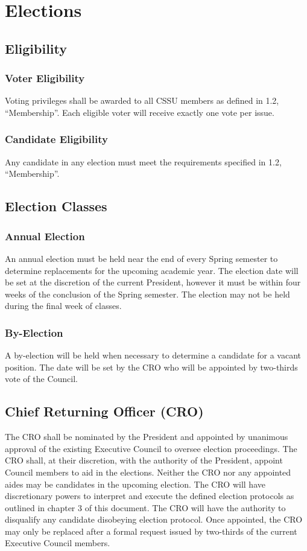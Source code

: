 \documentclass{article}
\begin{document}
\section{Elections} \label{sec:3}
\subsection{Eligibility} \label{sec:3.1}
\subsubsection{Voter Eligibility} \label{sec:3.1.1}
Voting privileges shall be awarded to all CSSU members as defined in 1.2, “Membership”. Each eligible voter will receive exactly one vote per issue.
\subsubsection{Candidate Eligibility}  \label{sec:3.1.2}
Any candidate in any election must meet the requirements specified in 1.2, “Membership”.
\subsection{Election Classes} \label{sec:3.2}
\subsubsection{Annual Election}  \label{sec:3.2.1}
An annual election must be held near the end of every Spring semester to determine replacements for the upcoming academic year. The election date will be set at the discretion of the current President, however it must be within four weeks of the conclusion of the Spring semester. The election may not be held during the final week of classes.
\subsubsection{By-Election} \label{sec:3.2.2}
A by-election will be held when necessary to determine a candidate for a vacant position. The date will be set by the CRO who will be appointed by two-thirds vote of the Council.
\subsection{Chief Returning Officer (CRO)}  \label{sec:3.3} 
The CRO shall be nominated by the President and appointed by unanimous approval of the existing Executive Council to oversee election proceedings. The CRO shall, at their discretion, with the authority of the President, appoint Council members to aid in the elections. Neither the CRO nor any appointed aides may be candidates in the upcoming election.
The CRO will have discretionary powers to interpret and execute the defined election protocols as outlined in chapter 3 of this document.
The CRO will have the authority to disqualify any candidate disobeying election protocol. Once appointed, the CRO may only be replaced after a formal request issued by two-thirds of the current Executive Council members.
\end{document}
